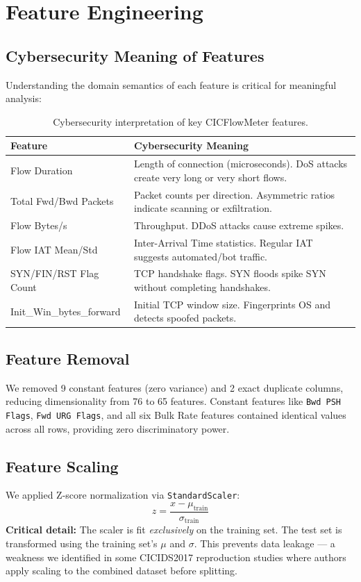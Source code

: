 \documentclass[11pt,a4paper]{article}
\begin{document}
\section{Feature Engineering}

\subsection{Cybersecurity Meaning of Features}
Understanding the domain semantics of each feature is critical for meaningful analysis:

\begin{table}[H]
\centering
\small
\begin{tabular}{lp{9cm}}
\toprule
\textbf{Feature} & \textbf{Cybersecurity Meaning} \\
\midrule
Flow Duration & Length of connection (microseconds). DoS attacks create very long or very short flows. \\
Total Fwd/Bwd Packets & Packet counts per direction. Asymmetric ratios indicate scanning or exfiltration. \\
Flow Bytes/s & Throughput. DDoS attacks cause extreme spikes. \\
Flow IAT Mean/Std & Inter-Arrival Time statistics. Regular IAT suggests automated/bot traffic. \\
SYN/FIN/RST Flag Count & TCP handshake flags. SYN floods spike SYN without completing handshakes. \\
Init\_Win\_bytes\_forward & Initial TCP window size. Fingerprints OS and detects spoofed packets. \\
\bottomrule
\end{tabular}
\caption{Cybersecurity interpretation of key CICFlowMeter features.}
\end{table}

\subsection{Feature Removal}
We removed 9 constant features (zero variance) and 2 exact duplicate columns, reducing dimensionality from 76 to 65 features. Constant features like \texttt{Bwd PSH Flags}, \texttt{Fwd URG Flags}, and all six Bulk Rate features contained identical values across all rows, providing zero discriminatory power.

\subsection{Feature Scaling}
We applied Z-score normalization via \texttt{StandardScaler}:
\begin{equation}
    z = \frac{x - \mu_{\text{train}}}{\sigma_{\text{train}}}
\end{equation}
\textbf{Critical detail:} The scaler is fit \textit{exclusively} on the training set. The test set is transformed using the training set's $\mu$ and $\sigma$. This prevents data leakage --- a weakness we identified in some CICIDS2017 reproduction studies where authors apply scaling to the combined dataset before splitting.
\end{document}
